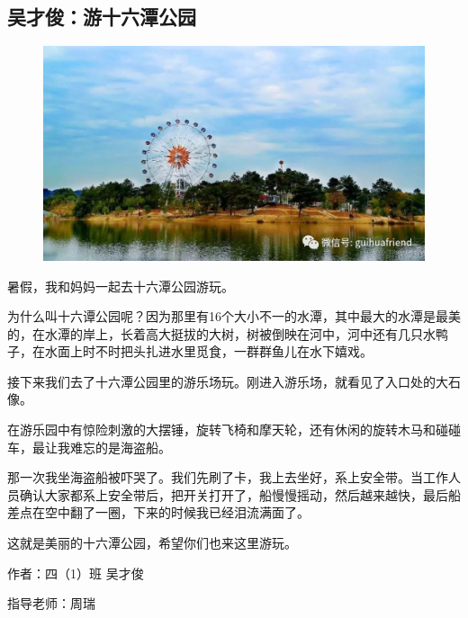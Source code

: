 \vspace{10pt}

{\centering\subsection*{吴才俊：游十六潭公园}}


\renewcommand{\leftmark}{吴才俊：游十六潭公园}

\begin{figure}[htbp]

\centering

\includegraphics[width = .5\textwidth]{./ch/21.jpg}

\end{figure}





暑假，我和妈妈一起去十六潭公园游玩。

为什么叫十六谭公园呢？因为那里有16个大小不一的水潭，其中最大的水潭是最美的，在水潭的岸上，长着高大挺拔的大树，树被倒映在河中，河中还有几只水鸭子，在水面上时不时把头扎进水里觅食，一群群鱼儿在水下嬉戏。

接下来我们去了十六潭公园里的游乐场玩。刚进入游乐场，就看见了入口处的大石像。

在游乐园中有惊险刺激的大摆锤，旋转飞椅和摩天轮，还有休闲的旋转木马和碰碰车，最让我难忘的是海盗船。

那一次我坐海盗船被吓哭了。我们先刷了卡，我上去坐好，系上安全带。当工作人员确认大家都系上安全带后，把开关打开了，船慢慢摇动，然后越来越快，最后船差点在空中翻了一圈，下来的时候我已经泪流满面了。

这就是美丽的十六潭公园，希望你们也来这里游玩。





\vspace{10pt}



作者：四（1）班 吴才俊



指导老师：周瑞





\vspace{10pt}

\hline



